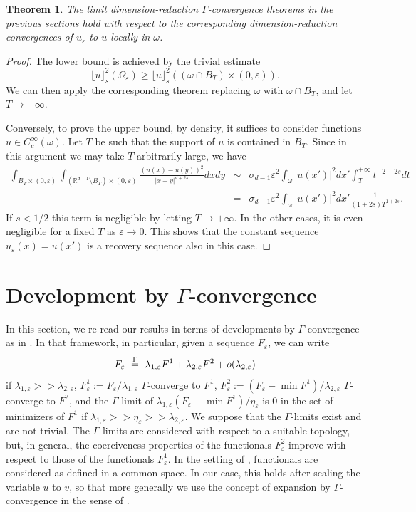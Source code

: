 \documentclass[11pt]{article}
\newtheorem{theorem}[definition]{Theorem}
\def\e{\varepsilon}
\begin{document}
\begin{theorem}
The limit dimension-reduction $\Gamma$-convergence theorems in the previous sections hold with respect to the corresponding dimension-reduction convergences of $u_{\e}$ to $u$ locally in $\omega$.
\end{theorem}

\begin{proof} The lower bound is achieved by the trivial estimate
$$
\lfloor u\rfloor^2_{s}(\Omega_\e)\ge
\lfloor u\rfloor^2_{s}((\omega\cap B_T)\times (0,\e)).
$$
We can then apply the corresponding theorem replacing $\omega$ with $\omega\cap B_T$, and let $T\to+\infty$.

Conversely, to prove the upper bound, by density, it suffices to consider functions $u
\in C^\infty_c(\omega)$. Let $T$ be such that the support of $u$ is contained in $B_T$. Since in this argument we may take $T$ arbitrarily large, we have 
\begin{eqnarray*}
\int_{B_T\times(0,\e)}\int_{(\mathbb R^{d-1}\setminus B_T)\times(0,\e)}\frac{(u(x)-u(y))^2}{
|x-y|^{d+2s}}dxdy
&\sim& \sigma_{d-1}\e^2 \int_{\omega}|u(x')|^2dx'\int_T^{+\infty}t^{-2-2s}dt\\
&=&\sigma_{d-1}\e^2 \int_{\omega}|u(x')|^2dx'\frac1{(1+2s)T^{1+2s}}.
\end{eqnarray*}
If $s<1/2$ this term is negligible by letting $T\to+\infty$. In the other cases, it is even negligible for a fixed $T$ as $\e\to 0$. This shows that the constant sequence $u_\e(x)=u(x')$ is a recovery sequence also in this case.
\end{proof}





\section{Development by $\Gamma$-convergence}
In this section, we re-read our results in terms of developments by $\Gamma$-convergence as in \cite{AnzB}. In that framework, in particular, given a sequence $F_\e$, we can write
$$
F_\e\ \buildrel\Gamma\over = \ \lambda_{1,\e} F^1+ \lambda_{2,\e} F^2+ o(\lambda_{2,\e})
$$
if $\lambda_{1,\e}>\!>\lambda_{2,\e}$,
$F^1_\e:=F_\e/\lambda_{1,\e}$ $\Gamma$-converge to $F^1$, $F^2_\e:=(F_\e-\min F^{1})/\lambda_{2,\e}$ $\Gamma$-converge to $F^2$,
and the $\Gamma$-limit of $\lambda_{1,\e}(F_\e-\min F^{1})/\eta_{\e}$ is $0$ in the set of minimizers of $F^{1}$ if $\lambda_{1,\e}>>\eta_\e>>\lambda_{2,\e}$. 
We suppose that the $\Gamma$-limits exist and are not trivial.
The $\Gamma$-limits are considered with respect to a suitable topology, but, in general, the coerciveness properties of the functionals $F^2_\e$ improve with respect to those of the functionals $F^1_\e$.
In the setting of \cite{AnzB}, functionals are considered as defined in a common space. In our case, this holds after scaling the variable $u$ to $v$, so that more generally we use the concept of expansion by $\Gamma$-convergence in the sense of \cite{BT}.
\end{document}
